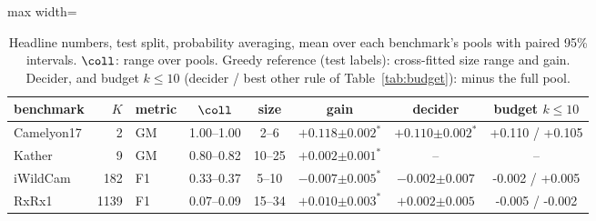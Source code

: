 \begin{table}[t]
\centering
\footnotesize
\caption{Headline numbers, test split, probability averaging, mean over each benchmark's pools with paired 95\% intervals. $\coll$: range over pools. Greedy reference (test labels): cross-fitted size range and gain. Decider, and budget $k\le10$ (decider / best other rule of Table~\ref{tab:budget}): minus the full pool.}
\label{tab:headline}
\setlength{\tabcolsep}{3pt}\begin{adjustbox}{max width=\linewidth}
\begin{tabular}{lrlccccc}
\toprule
benchmark & $K$ & metric & $\coll$ & size & gain & decider & budget $k\le10$ \\
\midrule
Camelyon17 & 2 & GM & 1.00--1.00 & 2--6 & $+0.118{\scriptstyle\pm0.002}^{\ast}$ & $+0.110{\scriptstyle\pm0.002}^{\ast}$ & +0.110 / +0.105 \\
Kather & 9 & GM & 0.80--0.82 & 10--25 & $+0.002{\scriptstyle\pm0.001}^{\ast}$ & -- & -- \\
iWildCam & 182 & F1 & 0.33--0.37 & 5--10 & $-0.007{\scriptstyle\pm0.005}^{\ast}$ & $-0.002{\scriptstyle\pm0.007}$ & -0.002 / +0.005 \\
RxRx1 & 1139 & F1 & 0.07--0.09 & 15--34 & $+0.010{\scriptstyle\pm0.003}^{\ast}$ & $+0.002{\scriptstyle\pm0.005}$ & -0.005 / -0.002 \\
\bottomrule
\end{tabular}
\end{adjustbox}
\end{table}
